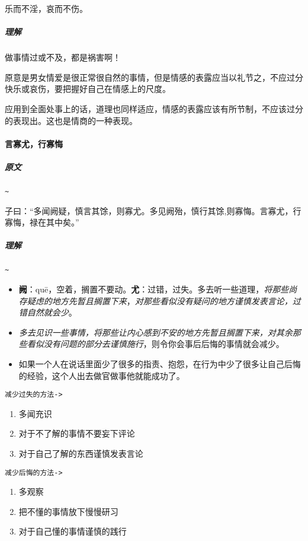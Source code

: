 \documentclass[UTF8,a4paper,8pt]{ctexbook}
\begin{document}
				乐而不淫，哀而不伤。
			
			\subparagraph{理解} 做事情过或不及，都是祸害啊！
			
			原意是男女情爱是很正常很自然的事情，但是情感的表露应当以礼节之，不应过分快乐或哀伤，要把握好自己在情感上的尺度。
			
			应用到全面处事上的话，道理也同样适应，情感的表露应该有所节制，不应该过分的表现出。这也是情商的一种表现。		
		
		\paragraph{言寡尤，行寡悔}
			\subparagraph{原文}\verb|~|
			
				子曰：“多闻阙疑，慎言其馀，则寡尤。多见阙殆，慎行其馀,则寡悔。言寡尤，行寡悔，禄在其中矣。”
			
			\subparagraph{理解}\verb|~|
			
				\begin{itemize}[itemindent = 1em]
					\item \textbf{阙}：quē，空着，搁置不要动。\textbf{尤}：过错，过失。多去听一些道理，\textit{将那些尚存疑虑的地方先暂且搁置下来}，\textit{对那些看似没有疑问的地方谨慎发表言论，过错自然就会少}。
					\item \textit{多去见识一些事情，将那些让内心感到不安的地方先暂且搁置下来，对其余那些看似没有问题的部分去谨慎施行}，则令你会事后后悔的事情就会减少。
					\item 如果一个人在说话里面少了很多的指责、抱怨，在行为中少了很多让自己后悔的经验，这个人出去做官做事他就能成功了。
				\end{itemize}
			
			\verb|减少过失的方法->|
				\begin{enumerate}[itemindent =2em]
						\item 多闻充识
						\item 对于不了解的事情不要妄下评论
						\item 对于自己了解的东西谨慎发表言论					
				\end{enumerate}

				
			\verb|减少后悔的方法->|
				\begin{enumerate}[itemindent = 2em]
					\item  多观察
					\item  把不懂的事情放下慢慢研习
					\item  对于自己懂的事情谨慎的践行									
				\end{enumerate}			
\end{document}
